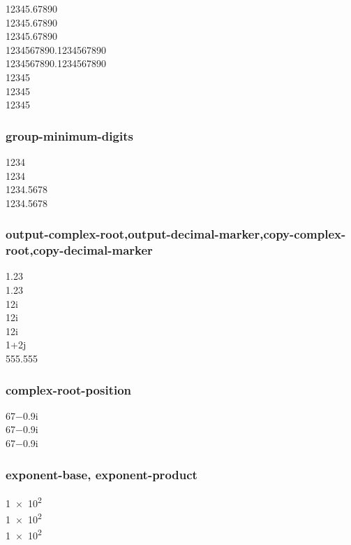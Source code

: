 \documentclass{article}
\begin{document}
\num[group-digits= false]{12345.67890}\\
\num[group-digits= decimal]{12345.67890} \\
\num[group-digits= integer]{12345.67890}\\

\num{1234567890.1234567890}\\
\num[group-four-digits]{1234567890.1234567890}\\

\num{12345} \\
\num[group-separator = {,}]{12345} \\
\num[group-separator = \text{~}]{12345}\\

\subsubsection{group-minimum-digits}
\num{1234} \\
\num[group-minimum-digits = 4]{1234} \\
\num{1234.5678} \\
\num[group-minimum-digits = 4]{1234.5678}\\

\subsubsection{output-complex-root,output-decimal-marker,copy-complex-root,copy-decimal-marker}
\num{1.23} \\
\num[output-decimal-marker = {,}]{1.23} \\
\num{1+2i} \\
\num[output-complex-root = \text{\ensuremath{i}}]{1+2i} \\
\num[output-complex-root = j]{1+2i} \\
\num[copy-complex-root]{1+2j} \\
\num[copy-decimal-marker]{555,555}\\

\subsubsection{complex-root-position}
\num{67-0.9i} \\
\num[complex-root-position = before-number]{67-0.9i} \\
\num[complex-root-position = after-number]{67-0.9i}\\

\subsubsection{exponent-base, exponent-product}
\num[exponent-product = \times]{1e2} \\
\num[exponent-product = \cdot]{1e2} \\
\num[exponent-base = 2]{1e2}\\
\end{document}
